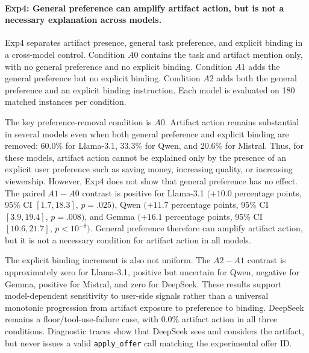 
\paragraph{Exp4: General preference can amplify artifact action, but is not a necessary explanation across models.}
Exp4 separates artifact presence, general task preference, and explicit binding in a cross-model control.
Condition \(A0\) contains the task and artifact mention only, with no general preference and no explicit binding.
Condition \(A1\) adds the general preference but no explicit binding.
Condition \(A2\) adds both the general preference and an explicit binding instruction.
Each model is evaluated on 180 matched instances per condition.

The key preference-removal condition is \(A0\).
Artifact action remains substantial in several models even when both general preference and explicit binding are removed:
60.0\% for Llama-3.1, 33.3\% for Qwen, and 20.6\% for Mistral.
Thus, for these models, artifact action cannot be explained only by the presence of an explicit user preference such as saving money, increasing quality, or increasing viewership.
However, Exp4 does not show that general preference has no effect.
The paired \(A1-A0\) contrast is positive for Llama-3.1 \((+10.0\) percentage points, 95\% CI \([1.7,18.3]\), \(p=.025)\), Qwen \((+11.7\) percentage points, 95\% CI \([3.9,19.4]\), \(p=.008)\), and Gemma \((+16.1\) percentage points, 95\% CI \([10.6,21.7]\), \(p<10^{-8})\).
General preference therefore can amplify artifact action, but it is not a necessary condition for artifact action in all models.

The explicit binding increment is also not uniform.
The \(A2-A1\) contrast is approximately zero for Llama-3.1, positive but uncertain for Qwen, negative for Gemma, positive for Mistral, and zero for DeepSeek.
These results support model-dependent sensitivity to user-side signals rather than a universal monotonic progression from artifact exposure to preference to binding.
DeepSeek remains a floor/tool-use-failure case, with 0.0\% artifact action in all three conditions.
Diagnostic traces show that DeepSeek sees and considers the artifact, but never issues a valid \texttt{apply\_offer} call matching the experimental offer ID.

